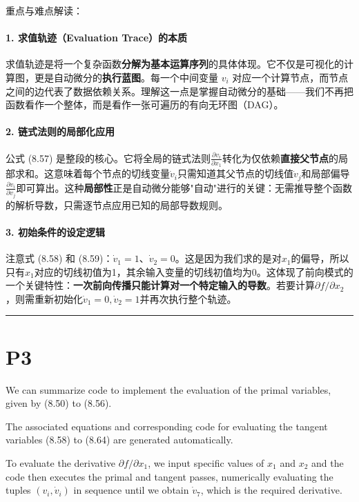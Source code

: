 \documentclass{article}
\begin{document}
{\color{blue}
重点与难点解读：

\paragraph{1. 求值轨迹（Evaluation Trace）的本质}
求值轨迹是将一个复杂函数\textbf{分解为基本运算序列}的具体体现。它不仅是可视化的计算图，更是自动微分的\textbf{执行蓝图}。每一个中间变量 $v_i$ 对应一个计算节点，而节点之间的边代表了数据依赖关系。理解这一点是掌握自动微分的基础——我们不再把函数看作一个整体，而是看作一张可遍历的有向无环图（DAG）。

\paragraph{2. 链式法则的局部化应用}
公式 (8.57) 是整段的核心。它将全局的链式法则$\frac{\partial v_i}{\partial x_1}$转化为仅依赖\textbf{直接父节点}的局部求和。这意味着每个节点的切线变量$\dot{v}_i$只需知道其父节点的切线值$\dot{v}_j$和局部偏导$\frac{\partial v_i}{\partial v_j}$即可算出。这种\textbf{局部性}正是自动微分能够"自动"进行的关键：无需推导整个函数的解析导数，只需逐节点应用已知的局部导数规则。

\paragraph{3. 初始条件的设定逻辑}
注意式 (8.58) 和 (8.59)：$\dot{v}_1 = 1$、$\dot{v}_2 = 0$。这是因为我们求的是对$x_1$的偏导，所以只有$x_1$对应的切线初值为1，其余输入变量的切线初值均为0。这体现了前向模式的一个关键特性：\textbf{一次前向传播只能计算对一个特定输入的导数}。若要计算$\partial f/\partial x_2$，则需重新初始化$\dot{v}_1=0, \dot{v}_2=1$并再次执行整个轨迹。

}

\noindent\rule{\linewidth}{0.4pt}

\section{P3}

We can summarize code to implement the evaluation of the primal variables, given by (8.50) to (8.56). 

The associated equations and corresponding code for evaluating the tangent variables (8.58) to (8.64) are generated automatically. 

To evaluate the derivative $\partial f / \partial x_1$, we input specific values of $x_1$ and $x_2$ and the code then executes the primal and tangent passes, numerically evaluating the tuples $(v_i, \dot{v}_i)$ in sequence until we obtain $\dot{v}_7$, which is the required derivative.
\end{document}
